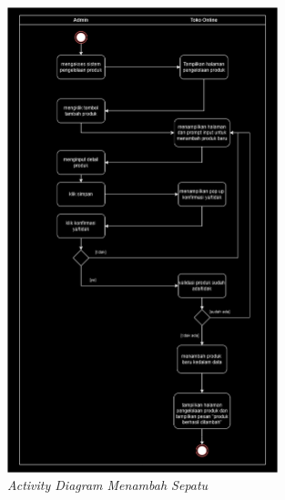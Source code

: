 \documentclass[journal,article,submit,pdftex,moreauthors]{Definitions/mdpi}
\begin{document}
\begin{figure}[H]
    \centering
    \includegraphics[width=0.7\textwidth]{images/avtivitymenambahsepatudiagram.png}
    \captionsetup{justification=centering}
    \caption{\textit{Activity Diagram Menambah Sepatu}}
    \label{fig:activity-recommendation}
\end{figure}
\end{document}
